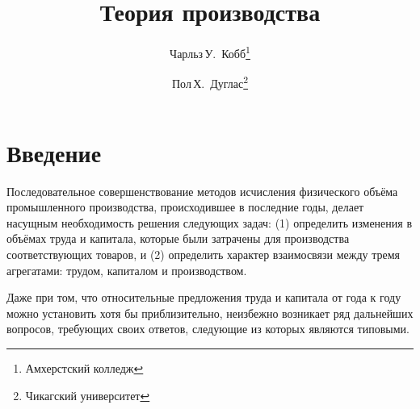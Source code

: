 \documentclass[leqno]{article}  %
\title{\renewcommand*{\thefootnote}{\arabic{footnote}}
Теория производства{}\footnotemark}
\author{\renewcommand*{\thefootnote}{\fnsymbol{footnote}}
Чарльз\,У.~Кобб\thanks{Амхерстский колледж} \and Пол\,Х.~Дуглас\thanks{Чикагский университет}}
\begin{document}
\maketitle
\setcounter{footnote}{1}
\section{Введение}
Последовательное совершенствование методов исчисления физического объёма промышленного производства, происходившее в последние годы, делает насущным необходимость решения следующих задач: (1) определить изменения в объёмах труда и капитала, которые были затрачены для производства соответствующих товаров, и (2) определить характер взаимосвязи между тремя агрегатами: трудом, капиталом и производством.
\par
Даже при том, что относительные предложения труда и капитала от года к году можно установить хотя бы приблизительно, неизбежно возникает ряд дальнейших вопросов, требующих своих ответов, следующие из которых являются типовыми. 
\end{document}
